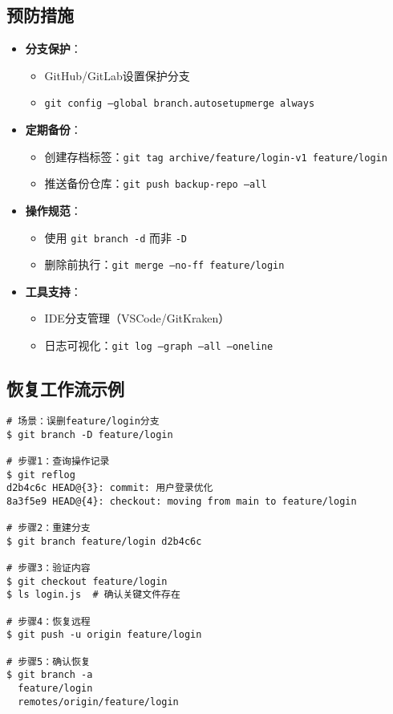 \subsection{预防措施}
\begin{itemize}[leftmargin=*, nosep]
    \item \textbf{分支保护}：
    \begin{itemize}[leftmargin=*, nosep]
        \item GitHub/GitLab设置保护分支
        \item \texttt{git config --global branch.autosetupmerge always}
    \end{itemize}
    
    \item \textbf{定期备份}：
    
\begin{itemize}[leftmargin=*, nosep]
        \item 创建存档标签：\texttt{git tag archive/feature/login-v1 feature/login}
        \item 推送备份仓库：\texttt{git push backup-repo --all}
    \end{itemize}
    
    \item \textbf{操作规范}：
    
\begin{itemize}[leftmargin=*, nosep]
        \item 使用 \texttt{git branch -d} 而非 \texttt{-D}
        \item 删除前执行：\texttt{git merge --no-ff feature/login}
    \end{itemize}
    
    \item \textbf{工具支持}：
    
\begin{itemize}[leftmargin=*, nosep]
        \item IDE分支管理（VSCode/GitKraken）
        \hline
        \item 日志可视化：\texttt{git log --graph --all --oneline}
    \end{itemize}
\end{itemize}

\subsection{恢复工作流示例}
\begin{verbatim}
# 场景：误删feature/login分支
$ git branch -D feature/login

# 步骤1：查询操作记录
$ git reflog
d2b4c6c HEAD@{3}: commit: 用户登录优化
8a3f5e9 HEAD@{4}: checkout: moving from main to feature/login

# 步骤2：重建分支
$ git branch feature/login d2b4c6c

# 步骤3：验证内容
$ git checkout feature/login
$ ls login.js  # 确认关键文件存在

# 步骤4：恢复远程
$ git push -u origin feature/login

# 步骤5：确认恢复
$ git branch -a
  feature/login
  remotes/origin/feature/login
\end{verbatim}

